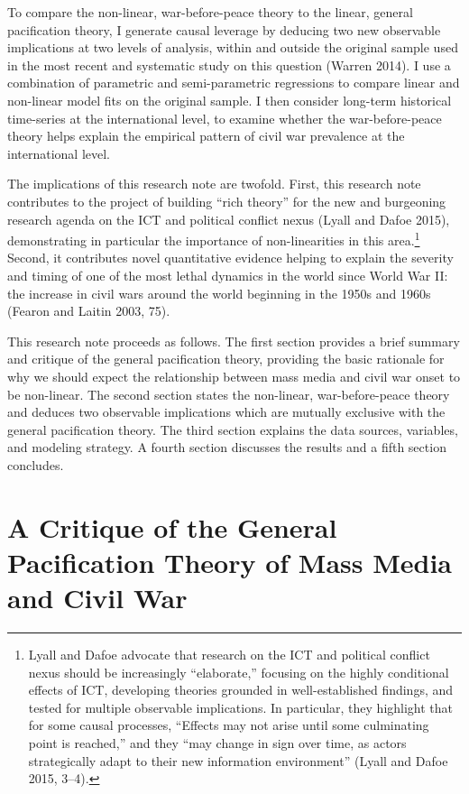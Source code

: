 \documentclass[12pt,article,oneside]{memoir}
\begin{document}
To compare the non-linear, war-before-peace theory to the linear,
general pacification theory, I generate causal leverage by deducing two
new observable implications at two levels of analysis, within and
outside the original sample used in the most recent and systematic study
on this question (Warren 2014). I use a combination of parametric and
semi-parametric regressions to compare linear and non-linear model fits
on the original sample. I then consider long-term historical time-series
at the international level, to examine whether the war-before-peace
theory helps explain the empirical pattern of civil war prevalence at
the international level.

The implications of this research note are twofold. First, this research
note contributes to the project of building ``rich theory'' for the new
and burgeoning research agenda on the ICT and political conflict nexus
(Lyall and Dafoe 2015), demonstrating in particular the importance of
non-linearities in this area.\footnote{Lyall and Dafoe advocate that
  research on the ICT and political conflict nexus should be
  increasingly ``elaborate,'' focusing on the highly conditional effects
  of ICT, developing theories grounded in well-established findings, and
  tested for multiple observable implications. In particular, they
  highlight that for some causal processes, ``Effects may not arise
  until some culminating point is reached,'' and they ``may change in
  sign over time, as actors strategically adapt to their new information
  environment'' (Lyall and Dafoe 2015, 3--4).} Second, it contributes
novel quantitative evidence helping to explain the severity and timing
of one of the most lethal dynamics in the world since World War II: the
increase in civil wars around the world beginning in the 1950s and 1960s
(Fearon and Laitin 2003, 75).

This research note proceeds as follows. The first section provides a
brief summary and critique of the general pacification theory, providing
the basic rationale for why we should expect the relationship between
mass media and civil war onset to be non-linear. The second section
states the non-linear, war-before-peace theory and deduces two
observable implications which are mutually exclusive with the general
pacification theory. The third section explains the data sources,
variables, and modeling strategy. A fourth section discusses the results
and a fifth section concludes.

\section{A Critique of the General Pacification Theory of Mass Media and
Civil
War}\label{a-critique-of-the-general-pacification-theory-of-mass-media-and-civil-war}
\end{document}
